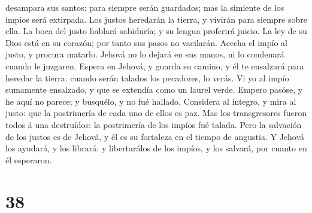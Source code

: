 desampara sus santos: para siempre serán guardados; mas la simiente de
los impíos será extirpada.  Los justos heredarán la tierra,
y vivirán para siempre sobre ella.  La boca del justo
hablará sabiduría; y su lengua proferirá juicio.  La ley de
su Dios está en su corazón; por tanto sus pasos no vacilarán.
 Acecha el impío al justo, y procura matarlo. 
Jehová no lo dejará en sus manos, ni lo condenará cuando le juzgaren.
 Espera en Jehová, y guarda su camino, y él te ensalzará
para heredar la tierra: cuando serán talados los pecadores, lo verás.
 Vi yo al impío sumamente ensalzado, y que se extendía como
un laurel verde.  Empero pasóse, y he aquí no parece; y
busquélo, y no fué hallado.  Considera al íntegro, y mira
al justo: que la postrimería de cada uno de ellos es paz. 
Mas los transgresores fueron todos á una destruídos: la postrimería de
los impíos fué talada.  Pero la salvación de los justos es
de Jehová, y él es su fortaleza en el tiempo de angustia. 
Y Jehová los ayudará, y los librará: y libertarálos de los impíos, y los
salvará, por cuanto en él esperaron.

\hypertarget{section-37}{%
\section{38}\label{section-37}}

